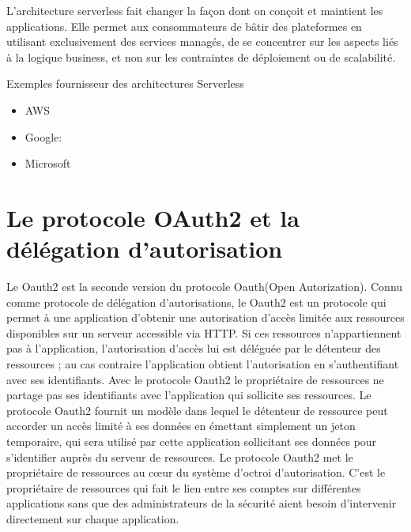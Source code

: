 L’architecture serverless fait changer la façon dont on conçoit et maintient les applications. Elle permet aux consommateurs de bâtir des plateformes en utilisant exclusivement des services managés, de se concentrer sur les aspects liés à la logique business, et non sur les contraintes de déploiement ou de scalabilité.
\begin{list}{•}
	\item  Exemples fournisseur des architectures Serverless
	\begin{itemize}
		\item AWS
		\item Google:
		\item Microsoft
	\end{itemize}

\end{list}



\section{Le protocole OAuth2 et la délégation d’autorisation}

Le Oauth2 est la seconde version du protocole Oauth(Open Autorization). Connu comme protocole de
délégation d’autorisations, le Oauth2 est un protocole qui permet à une application d’obtenir une autorisation d’accès limitée aux ressources disponibles sur un serveur accessible via HTTP. Si ces ressources
n’appartiennent pas à l’application, l’autorisation d’accès lui est déléguée par le détenteur des ressources ;
au cas contraire l’application obtient l’autorisation en s’authentifiant avec ses identifiants. Avec le protocole Oauth2 le propriétaire de ressources ne partage pas ses identifiants avec l’application qui sollicite ses
ressources. Le protocole Oauth2 fournit un modèle dans lequel le détenteur de ressource peut accorder un
accès limité à ses données en émettant simplement un jeton temporaire, qui sera utilisé par cette application
sollicitant ses données pour s’identifier auprès du serveur de ressources. Le protocole Oauth2 met le propriétaire de ressources au cœur du système d’octroi d’autorisation. C’est le propriétaire de ressources qui
fait le lien entre ses comptes sur différentes applications sans que des administrateurs de la sécurité aient
besoin d’intervenir directement sur chaque application.

